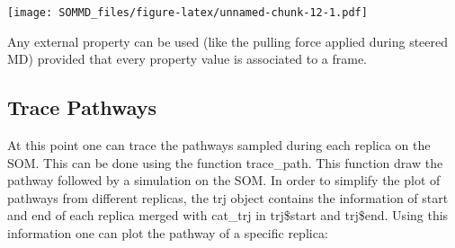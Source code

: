 \documentclass[
]{article}
\newenvironment{Shaded}{\begin{snugshade}}{\end{snugshade}}
\newcommand{\AttributeTok}[1]{\textcolor[rgb]{0.77,0.63,0.00}{#1}}
\newcommand{\CommentTok}[1]{\textcolor[rgb]{0.56,0.35,0.01}{\textit{#1}}}
\newcommand{\ControlFlowTok}[1]{\textcolor[rgb]{0.13,0.29,0.53}{\textbf{#1}}}
\newcommand{\DecValTok}[1]{\textcolor[rgb]{0.00,0.00,0.81}{#1}}
\newcommand{\FloatTok}[1]{\textcolor[rgb]{0.00,0.00,0.81}{#1}}
\newcommand{\FunctionTok}[1]{\textcolor[rgb]{0.00,0.00,0.00}{#1}}
\newcommand{\NormalTok}[1]{#1}
\newcommand{\SpecialCharTok}[1]{\textcolor[rgb]{0.00,0.00,0.00}{#1}}
\newcommand{\StringTok}[1]{\textcolor[rgb]{0.31,0.60,0.02}{#1}}
\begin{document}
\texttt{[image: SOMMD\_files/figure-latex/unnamed-chunk-12-1.pdf]}

Any external property can be used (like the pulling force applied during
steered MD) provided that every property value is associated to a frame.

\hypertarget{trace-pathways}{%
\subsection{Trace Pathways}\label{trace-pathways}}

At this point one can trace the pathways sampled during each replica on
the SOM. This can be done using the function trace\_path. This function
draw the pathway followed by a simulation on the SOM. In order to
simplify the plot of pathways from different replicas, the trj object
contains the information of start and end of each replica merged with
cat\_trj in trj\$start and trj\$end. Using this information one can plot
the pathway of a specific replica:

\begin{Shaded}
\end{Shaded}
\end{document}

